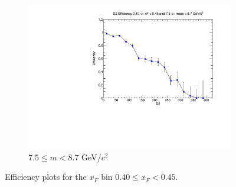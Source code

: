 \begin{figure}[p]
\begin{subfigure}[b]{0.32\textwidth}
        \includegraphics[width=\textwidth]{./kTrackerEfficiencyPlots/D2_Efficiency_xF8_mass10.pdf}
        \caption{$7.5 \leq m < 8.7$ GeV/$c^2$}
        \label{fig:xF8_mass10}
    \end{subfigure}
    \hfill
    \caption{Efficiency plots for the $x_F$ bin $0.40 \leq x_F < 0.45$.}
    \label{fig:xF8}
\end{figure}

\clearpage


